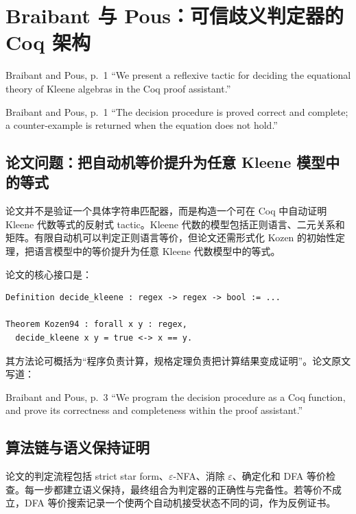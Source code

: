 \documentclass[UTF8,a4paper,12pt]{ctexart}
\begin{document}
\section{Braibant 与 Pous：可信歧义判定器的 Coq 架构}

\begin{paperquote}{Braibant and Pous, p.~1}
``We present a reflexive tactic for deciding the equational theory of Kleene algebras in the Coq proof assistant.''
\end{paperquote}

\begin{paperquote}{Braibant and Pous, p.~1}
``The decision procedure is proved correct and complete; a counter-example is returned when the equation does not hold.''
\end{paperquote}

\subsection{论文问题：把自动机等价提升为任意 Kleene 模型中的等式}

论文并不是验证一个具体字符串匹配器，而是构造一个可在 Coq 中自动证明 Kleene 代数等式的反射式 tactic。Kleene 代数的模型包括正则语言、二元关系和矩阵。有限自动机可以判定正则语言等价，但论文还需形式化 Kozen 的初始性定理，把语言模型中的等价提升为任意 Kleene 代数模型中的等式\cite[pp.~2--4]{braibant2012}。

论文的核心接口是：
\begin{lstlisting}[caption={反射式判定器的抽象规格}]
Definition decide_kleene : regex -> regex -> bool := ...

Theorem Kozen94 : forall x y : regex,
  decide_kleene x y = true <-> x == y.
\end{lstlisting}
其方法论可概括为“程序负责计算，规格定理负责把计算结果变成证明”。论文原文写道：
\begin{paperquote}{Braibant and Pous, p.~3}
``We program the decision procedure as a Coq function, and prove its correctness and completeness within the proof assistant.''
\end{paperquote}

\subsection{算法链与语义保持证明}

论文的判定流程包括 strict star form、$\varepsilon$-NFA、消除 $\varepsilon$、确定化和 DFA 等价检查。每一步都建立语义保持，最终组合为判定器的正确性与完备性。若等价不成立，DFA 等价搜索记录一个使两个自动机接受状态不同的词，作为反例证书。
\end{document}
